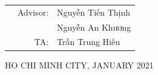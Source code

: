 \documentclass[a4paper]{article}
\numberwithin{equation}{section}
\begin{document}
\begin{titlepage}
  \vspace{3cm}

  \begin{table}[h]
    \begin{tabular}{rrl}
      \hspace{5cm} & Advisor: & Nguyễn Tiến Thịnh \\
                   &          & Nguyễn An Khương  \\
                   & TA\@:    & Trần Trung Hiếu   \\
    \end{tabular}
  \end{table}

  \begin{center}
    {\footnotesize HO CHI MINH CITY, JANUARY 2021}
  \end{center}
\end{titlepage}



\newpage
\tableofcontents
\newpage


\end{document}
